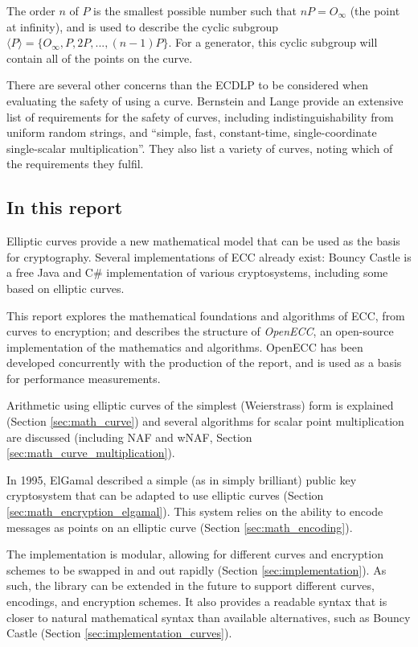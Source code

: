 The order \(n\) of \(P\) is the smallest possible number such that \(nP = O_{\infty}\) (the point at infinity), and is used to describe
the cyclic subgroup \(\langle P \rangle = \{ O_\infty, P, 2P, ..., (n-1)P \} \). For a generator, this cyclic subgroup
will contain all of the points on the curve.

There are several other concerns than the ECDLP to be considered when evaluating the safety of using a curve. Bernstein and Lange
provide an extensive list of requirements for the safety of curves, including indistinguishability from uniform random
strings, and ``simple, fast, constant-time, single-coordinate single-scalar multiplication''. They also list a variety
of curves, noting which of the requirements they fulfil.\cite{safecurves}

\subsection{In this report}

Elliptic curves provide a new mathematical model that can be used as the basis for cryptography. Several
implementations of ECC already exist: Bouncy Castle is a free Java and C\# implementation of various cryptosystems,
including some based on elliptic curves.\cite{bouncycastle}

This report explores the mathematical foundations and algorithms of ECC, from curves to encryption; and
describes the structure of \emph{OpenECC}, an open-source implementation of the mathematics and algorithms.
OpenECC has been developed concurrently with the production of the report, and is used as a basis for performance
measurements.

Arithmetic using elliptic curves of the simplest (Weierstrass) form is explained (Section \ref{sec:math_curve}) and
several algorithms for scalar point multiplication are discussed (including NAF and wNAF, Section
\ref{sec:math_curve_multiplication}).

In 1995, ElGamal described a simple (as in simply brilliant) public key cryptosystem that can be adapted
to use elliptic curves (Section \ref{sec:math_encryption_elgamal}). This system relies on the ability to
encode messages as points on an elliptic curve (Section \ref{sec:math_encoding}).

The implementation is modular, allowing for different curves and encryption schemes to be swapped in and out
rapidly (Section \ref{sec:implementation}). As such, the library can be extended in the future to support different
curves, encodings, and encryption schemes. It also provides a readable syntax that is closer to natural mathematical
syntax than available alternatives, such as Bouncy Castle (Section \ref{sec:implementation_curves}).

